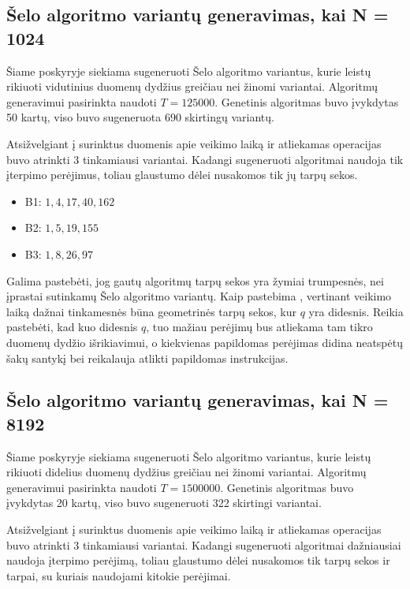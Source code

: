 \documentclass{VUMIFInfBakalaurinis}
\begin{document}
\subsection{Šelo algoritmo variantų generavimas, kai N = 1024}

Šiame poskyryje siekiama sugeneruoti Šelo algoritmo variantus,
kurie leistų rikiuoti vidutinius duomenų dydžius greičiau nei žinomi variantai.
Algoritmų generavimui pasirinkta naudoti $T = 125000$.
Genetinis algoritmas buvo įvykdytas 50 kartų, viso buvo sugeneruota 690 skirtingų variantų.

\pagebreak

Atsižvelgiant į surinktus duomenis apie veikimo laiką ir atliekamas operacijas buvo atrinkti 3 tinkamiausi variantai. 
Kadangi sugeneruoti algoritmai naudoja tik įterpimo perėjimus, toliau glaustumo dėlei nusakomos tik jų tarpų sekos.

\begin{itemize}
  \item B1: $1, 4, 17, 40, 162$
  \item B2: $1, 5, 19, 155$
  \item B3: $1, 8, 26, 97 $
\end{itemize}

Galima pastebėti, jog gautų algoritmų tarpų sekos yra žymiai trumpesnės, nei įprastai sutinkamų Šelo algoritmo variantų.
Kaip pastebima \cite{Radavičius_Baranauskas_2013}, vertinant veikimo laiką dažnai tinkamesnės būna geometrinės tarpų sekos, kur $q$ yra didesnis.
Reikia pastebėti, kad kuo didesnis $q$, tuo mažiau perėjimų bus atliekama tam tikro duomenų dydžio išrikiavimui,
o kiekvienas papildomas perėjimas didina neatspėtų šakų santykį bei reikalauja atlikti papildomas instrukcijas.  

\subsection{Šelo algoritmo variantų generavimas, kai N = 8192}

Šiame poskyryje siekiama sugeneruoti Šelo algoritmo variantus,
kurie leistų rikiuoti didelius duomenų dydžius greičiau nei žinomi variantai.
Algoritmų generavimui pasirinkta naudoti $T = 1500000$.
Genetinis algoritmas buvo įvykdytas 20 kartų, viso buvo sugeneruoti 322 skirtingi variantai.

Atsižvelgiant į surinktus duomenis apie veikimo laiką ir atliekamas operacijas buvo atrinkti 3 tinkamiausi variantai.
Kadangi sugeneruoti algoritmai dažniausiai naudoja įterpimo perėjimą, toliau glaustumo dėlei nusakomos tik tarpų sekos ir tarpai, su kuriais naudojami kitokie perėjimai.
\end{document}
